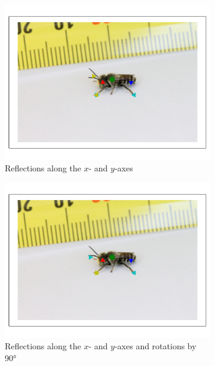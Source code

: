 \documentclass[11pt, oneside]{report}
\begin{document}
\begin{figure}[p]
\begin{subfigure}[b]{0.45\textwidth}
                \centering
                \includegraphics[width=\textwidth]{2refl_3.pdf}
                \caption{Reflections along the $x$- and $y$-axes\\\hspace{0pt}}
            \end{subfigure}
            \begin{subfigure}[b]{0.45\textwidth}
                \centering
                \includegraphics[width=\textwidth]{2reflrot_3.pdf}
                \caption{Reflections along the $x$- and $y$-axes and rotations by 90°}
            \end{subfigure}
            \begin{subfigure}[b]{0.45\textwidth}

\end{subfigure}
\end{figure}
\end{document}
